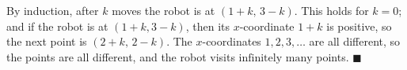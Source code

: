 By induction, after $k$ moves the robot is at $(1+k,\,3-k)$. This holds for $k=0$; and if the robot is at $(1+k,3-k)$, then its $x$-coordinate $1+k$ is positive, so the next point is $(2+k,\,2-k)$. The $x$-coordinates $1,2,3,\dots$ are all different, so the points are all different, and the robot visits $\boxed{\text{infinitely many}}$ points. $\blacksquare$
